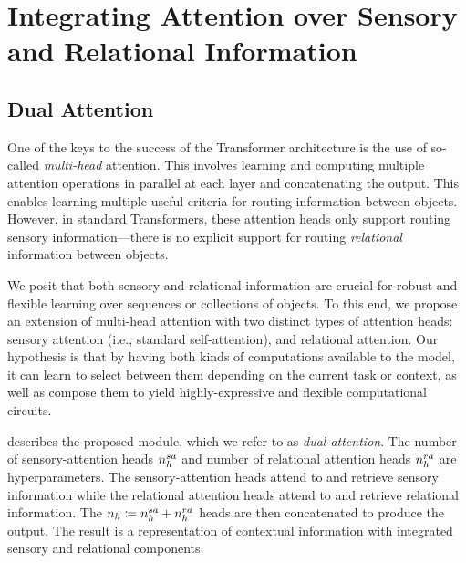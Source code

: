\section{Integrating Attention over Sensory and Relational Information}

\subsection{Dual Attention}

One of the keys to the success of the Transformer architecture is the use of so-called \textit{multi-head} attention. This involves learning and computing multiple attention operations in parallel at each layer and concatenating the output. This enables learning multiple useful criteria for routing information between objects. However, in standard Transformers, these attention heads only support routing sensory information---there is no explicit support for routing \textit{relational} information between objects.

We posit that both sensory and relational information are crucial for robust and flexible learning over sequences or collections of objects. To this end, we propose an extension of multi-head attention with two distinct types of attention heads: sensory attention (i.e., standard self-attention), and relational attention.  Our hypothesis is that by having both kinds of computations available to the model, it can learn to select between them depending on the current task or context, as well as compose them to yield highly-expressive and flexible computational circuits.

 describes the proposed module, which we refer to as \textit{dual-attention}. The number of sensory-attention heads $n_h^{sa}$ and number of relational attention heads $n_h^{ra}$ are hyperparameters. The sensory-attention heads attend to and retrieve sensory information while the relational attention heads attend to and retrieve relational information. The $n_h \coloneq n_h^{sa} + n_h^{ra}$ heads are then concatenated to produce the output. The result is a representation of contextual information with integrated sensory and relational components.

